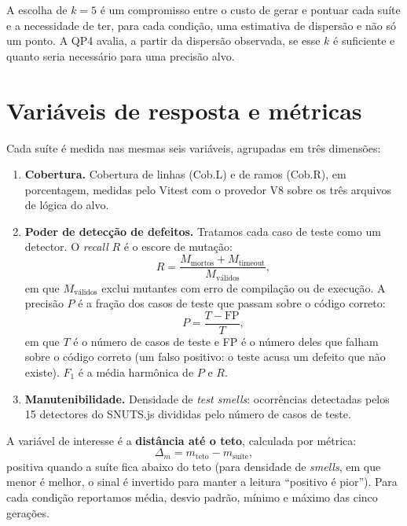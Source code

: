 A escolha de $k = 5$ é um compromisso entre o custo de gerar e pontuar cada suíte e a necessidade de ter, para cada condição, uma estimativa de dispersão e não só um ponto. A QP4 avalia, a partir da dispersão observada, se esse $k$ é suficiente e quanto seria necessário para uma precisão alvo.

\section{Variáveis de resposta e métricas}
\label{sec:metricas}

Cada suíte é medida nas mesmas seis variáveis, agrupadas em três dimensões:

\begin{enumerate}
    \item \textbf{Cobertura.} Cobertura de linhas (Cob.L) e de ramos (Cob.R), em porcentagem, medidas pelo Vitest com o provedor V8 sobre os três arquivos de lógica do alvo.
    \item \textbf{Poder de detecção de defeitos.} Tratamos cada caso de teste como um detector. O \textit{recall} $R$ é o escore de mutação:
    \begin{equation}
        R = \frac{M_{\text{mortos}} + M_{\text{timeout}}}{M_{\text{válidos}}},
        \label{eq:recall}
    \end{equation}
    em que $M_{\text{válidos}}$ exclui mutantes com erro de compilação ou de execução. A precisão $P$ é a fração dos casos de teste que passam sobre o código correto:
    \begin{equation}
        P = \frac{T - \text{FP}}{T},
        \label{eq:precisao}
    \end{equation}
    em que $T$ é o número de casos de teste e FP é o número deles que falham sobre o código correto (um falso positivo: o teste acusa um defeito que não existe). $F_1$ é a média harmônica de $P$ e $R$.
    \item \textbf{Manutenibilidade.} Densidade de \textit{test smells}: ocorrências detectadas pelos 15 detectores do SNUTS.js \cite{oliveira2024snuts} divididas pelo número de casos de teste.
\end{enumerate}

A variável de interesse é a \textbf{distância até o teto}, calculada por métrica:
\begin{equation}
    \Delta_m = m_{\text{teto}} - m_{\text{suíte}},
    \label{eq:gap}
\end{equation}
positiva quando a suíte fica abaixo do teto (para densidade de \textit{smells}, em que menor é melhor, o sinal é invertido para manter a leitura ``positivo é pior''). Para cada condição reportamos média, desvio padrão, mínimo e máximo das cinco gerações.

